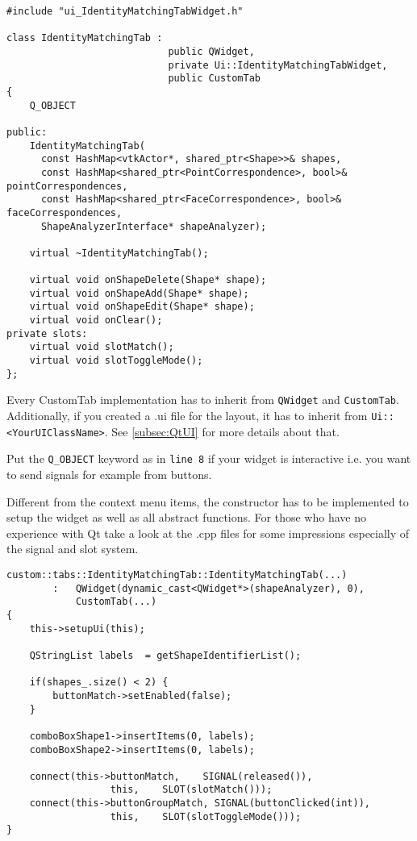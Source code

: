 \begin{lstlisting}[style=lstStyleCpp, caption={IdentityMatchingTab.h}]
#include "ui_IdentityMatchingTabWidget.h"

class IdentityMatchingTab : 
                            public QWidget, 
                            private Ui::IdentityMatchingTabWidget, 
                            public CustomTab 
{
    Q_OBJECT
    
public:
    IdentityMatchingTab(
      const HashMap<vtkActor*, shared_ptr<Shape>>& shapes,
      const HashMap<shared_ptr<PointCorrespondence>, bool>& pointCorrespondences,
      const HashMap<shared_ptr<FaceCorrespondence>, bool>& faceCorrespondences,
      ShapeAnalyzerInterface* shapeAnalyzer);
    
    virtual ~IdentityMatchingTab();
    
    virtual void onShapeDelete(Shape* shape);
    virtual void onShapeAdd(Shape* shape);
    virtual void onShapeEdit(Shape* shape);
    virtual void onClear();
private slots:
    virtual void slotMatch();
    virtual void slotToggleMode();
};
\end{lstlisting}

Every CustomTab implementation has to inherit from \texttt{QWidget} and \texttt{CustomTab}. Additionally, if you created a .ui file for the layout, it has to inherit from \texttt{Ui::<YourUIClassName>}. See \ref{subsec:QtUI} for more details about that.

Put the \texttt{Q\_OBJECT} keyword as in \texttt{line 8} if your widget is interactive i.e. you want to send signals for example from buttons. 

Different from the context menu items, the constructor has to be implemented to setup the widget as well as all abstract functions. For those who have no experience with Qt take a look at the .cpp files for some impressions especially of the signal and slot system.

\begin{lstlisting}[style=lstStyleCpp, caption={IdentityMatchingTab.cpp, Constructor}]
custom::tabs::IdentityMatchingTab::IdentityMatchingTab(...)
        :   QWidget(dynamic_cast<QWidget*>(shapeAnalyzer), 0),
            CustomTab(...)
{
    this->setupUi(this);
    
    QStringList labels  = getShapeIdentifierList();
    
    if(shapes_.size() < 2) {
        buttonMatch->setEnabled(false);
    }
    
    comboBoxShape1->insertItems(0, labels);
    comboBoxShape2->insertItems(0, labels);
    
    connect(this->buttonMatch,    SIGNAL(released()),
                  this,    SLOT(slotMatch()));
    connect(this->buttonGroupMatch, SIGNAL(buttonClicked(int)),
                  this,    SLOT(slotToggleMode()));
}
\end{lstlisting}

